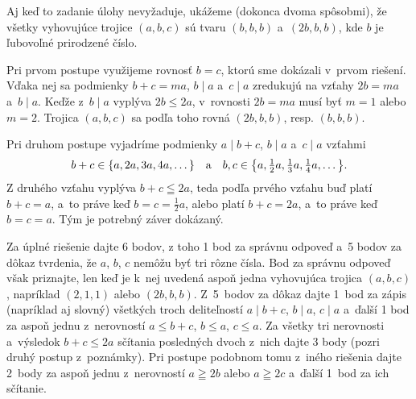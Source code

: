 {\poznamka
Aj keď to zadanie úlohy nevyžaduje, ukážeme (dokonca dvoma spôsobmi),
že všetky vyhovujúce trojice $(a,b,c)$ sú tvaru $(b,b,b)$
a~$(2b,b,b)$, kde $b$ je ľubovoľné prirodzené číslo.

Pri prvom postupe využijeme rovnosť $b=c$, ktorú sme dokázali
v~prvom riešení. Vďaka nej sa podmienky $b+c=ma$, $b\mid a$ a~$c\mid a$
zredukujú na vzťahy $2b=ma$ a~$b\mid a$. Keďže z~$b\mid a$ vyplýva $2b\leq 2a$,
v~rovnosti $2b=ma$ musí byť $m=1$ alebo $m=2$. Trojica
$(a,b,c)$ sa podľa toho rovná $(2b,b,b)$, resp. $(b,b,b)$.

Pri druhom postupe vyjadríme podmienky $a\mid b+c$, $b\mid a$ a~$c\mid a$
vzťahmi
$$
b+c\in\{a,2a,3a,4a,\dots\}\quad\hbox{a}\quad
b,c\in\bigl\{a,\tfrac12a,\tfrac13a,\tfrac14a,\dots \bigr\}.
$$
Z druhého vzťahu vyplýva $b+c\leqq2a$, teda podľa prvého vzťahu buď platí
$b+c=a$, a~to práve
keď $b=c=\frac12a$,
alebo platí $b+c=2a$, a~to práve keď $b=c=a$.
Tým je potrebný záver dokázaný.

\schemaABC
Za úplné riešenie dajte 6 bodov, z toho 1 bod za správnu odpoveď
a~5 bodov za dôkaz tvrdenia, že $a$, $b$, $c$ nemôžu byť tri rôzne
čísla. Bod za správnu odpoveď však priznajte, len keď je k~nej
uvedená aspoň jedna vyhovujúca trojica $(a,b,c)$,
napríklad $(2,1,1)$ alebo $(2b,b,b)$. Z~5~bodov za dôkaz dajte
1~bod za zápis (napríklad aj slovný) všetkých troch deliteľností $a\mid b+c$, $b\mid a$,
$c\mid a$ a~ďalší 1 bod za aspoň jednu z~nerovností
$a\leq b+c$, $b\leq a$, $c\leq a$. Za všetky tri nerovnosti
a~výsledok $b+c\leq 2a$ sčítania posledných dvoch z~nich dajte 3 body
(pozri druhý postup z~poznámky). Pri postupe podobnom tomu z~iného
riešenia dajte 2~body za aspoň jednu z~nerovností $a\geqq 2b$ alebo
$a\geqq 2c$ a~ďalší 1~bod za ich sčítanie.
\endschema
}

